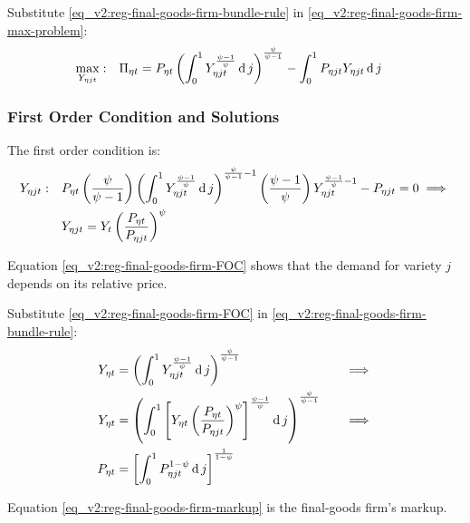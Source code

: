 \documentclass[../thesis.tex]{subfiles}
\begin{document}
Substitute \ref{eq_v2:reg-final-goods-firm-bundle-rule} in \ref{eq_v2:reg-final-goods-firm-max-problem}:
\begin{align}
	\label{eq_v2:reg-final-goods-firm-max-problem-2}
	\max_{Y_{\eta jt}}: & \quad \Pi_{\eta t} = P_{\eta t} \left( \int_{0}^{1} Y_{\eta jt}^{\frac{\psi-1}{\psi}} \operatorname{d} j \right)^{\frac{\psi}{\psi-1}} - \int_{0}^{1} P_{\eta jt} Y_{\eta jt} \operatorname{d} j
\end{align}

\subsubsection*{First Order Condition and Solutions}

The first order condition is:
\begin{align}
	Y_{\eta jt}:\quad & P_{\eta t} \left( \frac{\psi}{\psi-1} \right) \left( \int_{0}^{1} Y_{\eta jt}^{\frac{\psi-1}{\psi}} \operatorname{d} j \right)^{\frac{\psi}{\psi-1}-1} \left( \frac{\psi-1}{\psi} \right) Y_{\eta jt}^{\frac{\psi-1}{\psi}-1} - P_{\eta jt} = 0 \implies \nonumber \\
	\label{eq_v2:reg-final-goods-firm-FOC}
	& Y_{\eta jt} = Y_{t} \left( \frac{P_{\eta t}}{P_{\eta jt}} \right)^{\psi}
\end{align}

Equation \ref{eq_v2:reg-final-goods-firm-FOC} shows that the demand for variety $j$ depends on its relative price. 

Substitute \ref{eq_v2:reg-final-goods-firm-FOC} in \ref{eq_v2:reg-final-goods-firm-bundle-rule}:
\begin{alignat}{2}
	Y_{\eta t} & = \left( \int_{0}^{1} Y_{\eta jt}^{\frac{\psi-1}{\psi}} \operatorname{d} j \right)^{\frac{\psi}{\psi-1}} &\implies \nonumber \\
	Y_{\eta t} & = \left( \int_{0}^{1} \left[ Y_{\eta t} \left( \frac{P_{\eta t}}{P_{\eta jt}} \right)^{\psi} \right]^{\frac{\psi-1}{\psi}} \operatorname{d} j \right)^{\frac{\psi}{\psi-1}} \quad &\implies \nonumber \\
	P_{\eta t} & = \left[ \int_{0}^{1} P_{\eta jt}^{1-\psi} \operatorname{d} j \right]^{\frac{1}{1-\psi}} \label{eq_v2:reg-final-goods-firm-markup}
\end{alignat}

Equation \ref{eq_v2:reg-final-goods-firm-markup} is the final-goods firm's markup.

\end{document}
